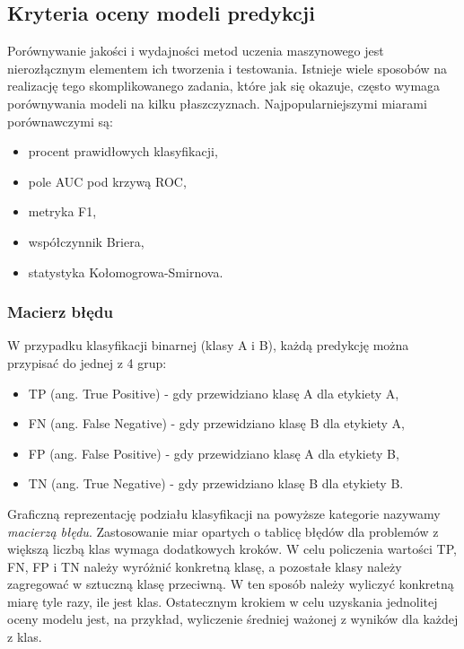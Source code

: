 \documentclass[a4paper, twoside, 11pt, openright]{article}
\begin{document}
\subsection{Kryteria oceny modeli predykcji}

Porównywanie jakości i wydajności metod uczenia maszynowego jest nierozłącznym elementem ich tworzenia i testowania. Istnieje wiele sposobów na realizację tego skomplikowanego zadania, które jak się okazuje, często wymaga porównywania modeli na kilku płaszczyznach. Najpopularniejszymi miarami porównawczymi są:
\begin{itemize}
\item procent prawidłowych klasyfikacji,
\item pole AUC pod krzywą ROC,
\item metryka F1,
\item współczynnik Briera,
\item statystyka Kołomogrowa-Smirnova.
\end{itemize}

\subsubsection{Macierz błędu}

W przypadku klasyfikacji binarnej (klasy A i B), każdą predykcję można przypisać do jednej z 4 grup:
\begin{itemize}
\item TP (ang. True Positive) - gdy przewidziano klasę A dla etykiety A,
\item FN (ang. False Negative) - gdy przewidziano klasę B dla etykiety A,
\item FP (ang. False Positive) - gdy przewidziano klasę A dla etykiety B,
\item TN (ang. True Negative) - gdy przewidziano klasę B dla etykiety B.
\end{itemize}

Graficzną reprezentację podziału klasyfikacji na powyższe kategorie nazywamy \textit{macierzą błędu}. Zastosowanie miar opartych o tablicę błędów dla problemów z większą liczbą klas wymaga dodatkowych kroków. W celu policzenia wartości TP, FN, FP i TN należy wyróżnić konkretną klasę, a pozostałe klasy należy zagregować w sztuczną klasę przeciwną. W ten sposób należy wyliczyć konkretną miarę tyle razy, ile jest klas. Ostatecznym krokiem w celu uzyskania jednolitej oceny modelu jest, na przykład, wyliczenie średniej ważonej z wyników dla każdej z klas.
\end{document}

